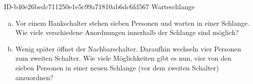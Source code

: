 \begin{exercise}
      {ID-b40e26bedc711250e1e5c99a71810ab6dc6fd567}
      {Warteschlange}
  \ifproblem\problem
    \begin{enumerate}[a)]
      \item Vor einem Bankschalter stehen sieben Personen und warten in einer
            Schlange. Wie viele verschiedene Anordnungen innerhalb der Schlange
            sind möglich?
      \item Wenig später öffnet der Nachbarschalter. Daraufhin wechseln vier
            Personen zum zweiten Schalter. Wie viele Möglichkeiten gibt es nun,
            vier von den sieben Personen in einer neuen Schlange (vor dem zweiten
            Schalter) anzuordnen?
    \end{enumerate}
  \fi
\end{exercise}
